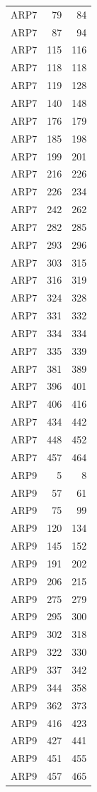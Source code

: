 \begin{longtable}{@{}lrr@{}}
  ARP7 & 79 & 84 \\
  ARP7 & 87 & 94 \\
  ARP7 & 115 & 116 \\
  ARP7 & 118 & 118 \\
  ARP7 & 119 & 128 \\
  ARP7 & 140 & 148 \\
  ARP7 & 176 & 179 \\
  ARP7 & 185 & 198 \\
  ARP7 & 199 & 201 \\
  ARP7 & 216 & 226 \\
  ARP7 & 226 & 234 \\
  ARP7 & 242 & 262 \\
  ARP7 & 282 & 285 \\
  ARP7 & 293 & 296 \\
  ARP7 & 303 & 315 \\
  ARP7 & 316 & 319 \\
  ARP7 & 324 & 328 \\
  ARP7 & 331 & 332 \\
  ARP7 & 334 & 334 \\
  ARP7 & 335 & 339 \\
  ARP7 & 381 & 389 \\
  ARP7 & 396 & 401 \\
  ARP7 & 406 & 416 \\
  ARP7 & 434 & 442 \\
  ARP7 & 448 & 452 \\
  ARP7 & 457 & 464 \\
  ARP9 & 5 & 8 \\
  ARP9 & 57 & 61 \\
  ARP9 & 75 & 99 \\
  ARP9 & 120 & 134 \\
  ARP9 & 145 & 152 \\
  ARP9 & 191 & 202 \\
  ARP9 & 206 & 215 \\
  ARP9 & 275 & 279 \\
  ARP9 & 295 & 300 \\
  ARP9 & 302 & 318 \\
  ARP9 & 322 & 330 \\
  ARP9 & 337 & 342 \\
  ARP9 & 344 & 358 \\
  ARP9 & 362 & 373 \\
  ARP9 & 416 & 423 \\
  ARP9 & 427 & 441 \\
  ARP9 & 451 & 455 \\
  ARP9 & 457 & 465 \\
\end{longtable}
